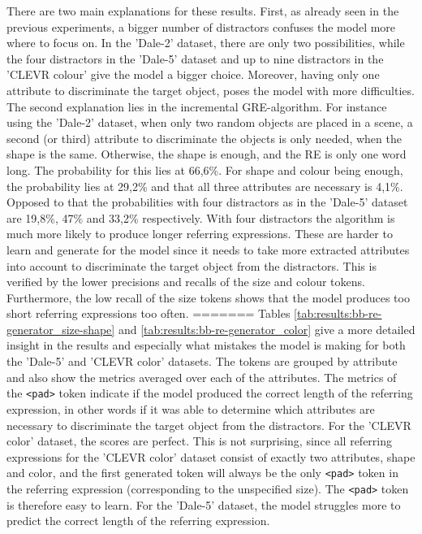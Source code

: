 \documentclass[11pt]{article}
\begin{document}
There are two main explanations for these results.
First, as already seen in the previous experiments, a bigger number of distractors confuses the model more where to focus on.
In the 'Dale-2' dataset, there are only two possibilities, while the four distractors in the 'Dale-5' dataset and up to nine distractors in the 'CLEVR colour' give the model a bigger choice.
Moreover, having only one attribute to discriminate the target object, poses the model with more difficulties.
The second explanation lies in the incremental GRE-algorithm.
For instance using the 'Dale-2' dataset, when only two random objects are placed in a scene, a second (or third) attribute to discriminate the objects is only needed, when the shape is the same.
Otherwise, the shape is enough, and the RE is only one word long.
The probability for this lies at 66,6\%.
For shape and colour being enough, the probability lies at 29,2\% and that all three attributes are necessary is 4,1\%.
Opposed to that the probabilities with four distractors as in the 'Dale-5' dataset are 19,8\%, 47\% and 33,2\% respectively.
With four distractors the algorithm is much more likely to produce longer referring expressions.
These are harder to learn and generate for the model since it needs to take more extracted attributes into account to discriminate the target object from the distractors.
This is verified by the lower precisions and recalls of the size and colour tokens.
Furthermore, the low recall of the size tokens shows that the model produces too short referring expressions too often.
=======
Tables \ref{tab:results:bb-re-generator_size-shape} and \ref{tab:results:bb-re-generator_color} give a more detailed insight in the results and especially what mistakes the model is making for both the 'Dale-5' and 'CLEVR color' datasets.
The tokens are grouped by attribute and also show the metrics averaged over each of the attributes.
The metrics of the \texttt{<pad>} token indicate if the model produced the correct length of the referring expression, in other words if it was able to determine which attributes are necessary to discriminate the target object from the distractors.
For the 'CLEVR color' dataset, the scores are perfect.
This is not surprising, since all referring expressions for the 'CLEVR color' dataset consist of exactly two attributes, shape and color, and the first generated token will always be the only \texttt{<pad>} token in the referring expression (corresponding to the unspecified size).
The \texttt{<pad>} token is therefore easy to learn.
For the 'Dale-5' dataset, the model struggles more to predict the correct length of the referring expression.
\end{document}
